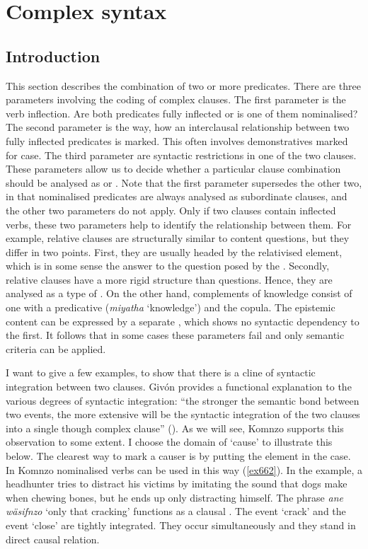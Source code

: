 
\chapter{Complex syntax} \label{cha:interclausalsyntax}

\section{Introduction}\label{interclausintro}

This section describes the combination of two or more predicates. There are three parameters involving the coding of complex clauses. The first parameter is the verb inflection. Are both predicates fully inflected or is one of them nominalised? The second parameter is the way, how an interclausal relationship between two fully inflected predicates is marked. This often involves demonstratives marked for case. The third parameter are syntactic restrictions in one of the two clauses. These parameters allow us to decide whether a particular clause combination should be analysed as  or . Note that the first parameter supersedes the other two, in that nominalised predicates are always analysed as subordinate clauses, and the other two parameters do not apply. Only if two clauses contain inflected verbs, these two parameters help to identify the relationship between them. For example, relative clauses are structurally similar to content questions, but they differ in two points. First, they are usually headed by the relativised element, which is in some sense the answer to the question posed by the . Secondly, relative clauses have a more rigid structure than questions. Hence, they are analysed as a type of . On the other hand, complements of knowledge consist of one  with a predicative  (\emph{miyatha} `knowledge') and the copula. The epistemic content can be expressed by a separate , which shows no syntactic dependency to the first. It follows that in some cases these parameters fail and only semantic criteria can be applied.

I want to give a few examples, to show that there is a cline of syntactic integration between two clauses. Givón provides a functional explanation to the various degrees of syntactic integration: ``the stronger the semantic bond between two events, the more extensive will be the syntactic integration of the two clauses into a single though complex clause'' (\citeyear[41]{Givon:2001syntax}). As we will see, Komnzo supports this observation to some extent. I choose the domain of `cause' to illustrate this below. The clearest way to mark a causer is by putting the element in the  case. In Komnzo nominalised verbs can be used in this way (\ref{ex662}). In the example, a  headhunter tries to distract his victims by imitating the sound that dogs make when chewing bones, but he ends up only distracting himself. The phrase \emph{ane wäsifnzo} `only that cracking' functions as a clausal . The event `crack' and the event `close' are tightly integrated. They occur simultaneously and they stand in direct causal relation.

